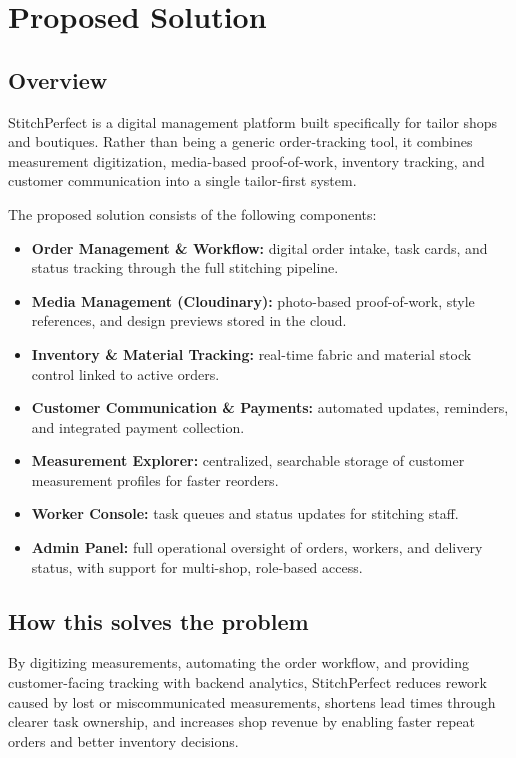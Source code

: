 \documentclass[11pt,a4paper]{article}
\begin{document}
\section{Proposed Solution}
\subsection{Overview}
StitchPerfect is a digital management platform built specifically for tailor shops and boutiques. Rather than being a generic order-tracking tool, it combines measurement digitization, media-based proof-of-work, inventory tracking, and customer communication into a single tailor-first system.

The proposed solution consists of the following components:
\begin{itemize}[leftmargin=1.4em]
\item \textbf{Order Management \& Workflow:} digital order intake, task cards, and status tracking through the full stitching pipeline.
\item \textbf{Media Management (Cloudinary):} photo-based proof-of-work, style references, and design previews stored in the cloud.
\item \textbf{Inventory \& Material Tracking:} real-time fabric and material stock control linked to active orders.
\item \textbf{Customer Communication \& Payments:} automated updates, reminders, and integrated payment collection.
\item \textbf{Measurement Explorer:} centralized, searchable storage of customer measurement profiles for faster reorders.
\item \textbf{Worker Console:} task queues and status updates for stitching staff.
\item \textbf{Admin Panel:} full operational oversight of orders, workers, and delivery status, with support for multi-shop, role-based access.
\end{itemize}

\subsection{How this solves the problem}
By digitizing measurements, automating the order workflow, and providing customer-facing tracking with backend analytics, StitchPerfect reduces rework caused by lost or miscommunicated measurements, shortens lead times through clearer task ownership, and increases shop revenue by enabling faster repeat orders and better inventory decisions.
\end{document}
